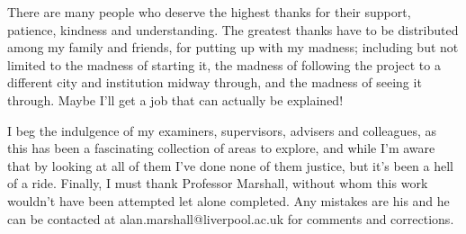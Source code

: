 There are many people who deserve the highest thanks for their support, patience, kindness and understanding.
The greatest thanks have to be distributed among my family and friends, for putting up with my madness; including but not limited to the madness of starting it, the madness of following the project to a different city and institution midway through, and the madness of seeing it through.
Maybe I'll get a job that can actually be explained!

I beg the indulgence of my examiners, supervisors, advisers and colleagues, as this has been a fascinating collection of areas to explore, and while I'm aware that by looking at all of them I've done none of them justice, but it's been a hell of a ride.
Finally, I must thank Professor Marshall, without whom this work wouldn't have been attempted let alone completed.
Any mistakes are his and he can be contacted at alan.marshall@liverpool.ac.uk for comments and corrections.